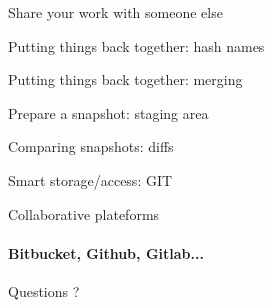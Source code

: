 \documentclass[english]{slides}
\begin{document}
\begin{frame}{Share your work with someone else}
\end{frame}

\begin{frame}{Putting things back together: hash names}
\end{frame}

\begin{frame}{Putting things back together: merging}
\end{frame}

\begin{frame}{Prepare a snapshot: staging area}
\end{frame}

\begin{frame}{Comparing snapshots: diffs}
\end{frame}

\begin{frame}{Smart storage/access: GIT}



\end{frame}

\begin{frame}{Collaborative plateforms }
\framesubtitle{Bitbucket, Github, Gitlab...}
\end{frame}

\begin{frame}
\begin{center}\huge
Questions ?
\end{center}
\end{frame}
\end{document}
